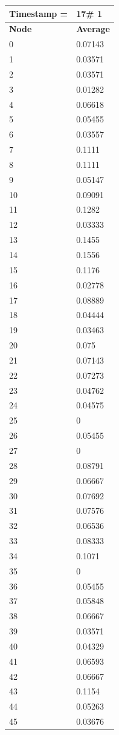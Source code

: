 \begin{tabular}{|l||l|}
\hline
\textbf{Timestamp =} & \textbf{17}\# 1\\\hline
	\textbf{Node} & \textbf{Average} \\ \hline
\hline
	0 & 0.07143 \\ \hline
	1 & 0.03571 \\ \hline
	2 & 0.03571 \\ \hline
	3 & 0.01282 \\ \hline
	4 & 0.06618 \\ \hline
	5 & 0.05455 \\ \hline
	6 & 0.03557 \\ \hline
	7 & 0.1111 \\ \hline
	8 & 0.1111 \\ \hline
	9 & 0.05147 \\ \hline
	10 & 0.09091 \\ \hline
	11 & 0.1282 \\ \hline
	12 & 0.03333 \\ \hline
	13 & 0.1455 \\ \hline
	14 & 0.1556 \\ \hline
	15 & 0.1176 \\ \hline
	16 & 0.02778 \\ \hline
	17 & 0.08889 \\ \hline
	18 & 0.04444 \\ \hline
	19 & 0.03463 \\ \hline
	20 & 0.075 \\ \hline
	21 & 0.07143 \\ \hline
	22 & 0.07273 \\ \hline
	23 & 0.04762 \\ \hline
	24 & 0.04575 \\ \hline
	25 & 0 \\ \hline
	26 & 0.05455 \\ \hline
	27 & 0 \\ \hline
	28 & 0.08791 \\ \hline
	29 & 0.06667 \\ \hline
	30 & 0.07692 \\ \hline
	31 & 0.07576 \\ \hline
	32 & 0.06536 \\ \hline
	33 & 0.08333 \\ \hline
	34 & 0.1071 \\ \hline
	35 & 0 \\ \hline
	36 & 0.05455 \\ \hline
	37 & 0.05848 \\ \hline
	38 & 0.06667 \\ \hline
	39 & 0.03571 \\ \hline
	40 & 0.04329 \\ \hline
	41 & 0.06593 \\ \hline
	42 & 0.06667 \\ \hline
	43 & 0.1154 \\ \hline
	44 & 0.05263 \\ \hline
	45 & 0.03676 \\ \hline
\end{tabular}
